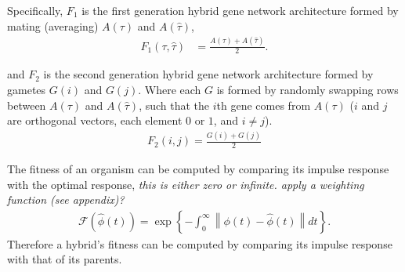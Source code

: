 \documentclass{article}
\newcommand{\plr}[1]{{\color{blue}\it #1}}
\newcommand{\1}{\mathbbm{1}}
\begin{document}
      Specifically, $F_{1}$ is the first generation hybrid gene network architecture formed by mating (averaging) $A(\tau)$ and $A(\hat{\tau})$, 
      \begin{align}
        F_{1}(\tau, \hat{\tau}) &= \frac{ A(\tau) + A(\hat{\tau}) }{2}  .
      \end{align}

      and $F_{2}$ is the second generation hybrid gene network architecture formed by gametes $G(i)$ and $G(j)$. Where each $G$ is formed by randomly swapping rows between $A(\tau)$ and $A(\hat{\tau})$, such that the $i$th  gene comes from $A(\tau)$ ($i$ and $j$ are orthogonal vectors, each element $0$ or $1$, and $i \neq j$).
      \begin{align}
        F_{2}(i, j) = \frac{G (i) + G(j)}{2}
      \end{align}


      The fitness of an organism can be computed by comparing its impulse response with the optimal response,
      \plr{this is either zero or infinite.  apply a weighting function (see appendix)?}
      \begin{align}
        \mathcal{F}\left( \widehat{\phi}(t) \right) = \exp \left\{- \int_{0}^{\infty} \left\lVert \phi(t) - \widehat{\phi}(t) \right\rVert dt \right\}  .
      \end{align}
      Therefore a hybrid's fitness can be computed by comparing its impulse response with that of its parents.
\end{document}
